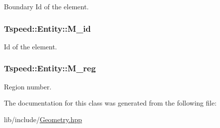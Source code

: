 Boundary Id of the element. 

\hypertarget{classTspeed_1_1Entity_a78689c259080e251d0e4ae01db20a7ba}{
\subsubsection[{M\-\_\-id}]{ Tspeed\-::\-Entity\-::\-M\-\_\-id\hspace{0.3cm}{\ttfamily [protected]}}}\label{classTspeed_1_1Entity_a78689c259080e251d0e4ae01db20a7ba}


Id of the element. 

\hypertarget{classTspeed_1_1Entity_a4c553133417f2766bd5898d2fa558374}{
\subsubsection[{M\-\_\-reg}]{ Tspeed\-::\-Entity\-::\-M\-\_\-reg\hspace{0.3cm}{\ttfamily [protected]}}}\label{classTspeed_1_1Entity_a4c553133417f2766bd5898d2fa558374}


Region number. 



The documentation for this class was generated from the following file\-:\begin{DoxyCompactItemize}
\item 
lib/include/\hyperlink{Geometry_8hpp}{Geometry.\-hpp}\end{DoxyCompactItemize}
